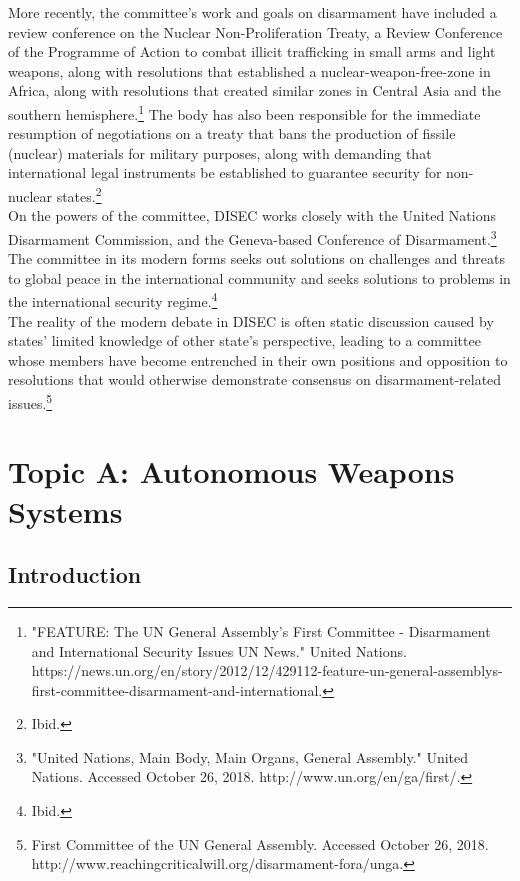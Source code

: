 \documentclass[10pt, letterpaper]{article}
\begin{document}
More recently, the committee's work and goals on disarmament have
included a review conference on the Nuclear Non-Proliferation Treaty, a
Review Conference of the Programme of Action to combat illicit
trafficking in small arms and light weapons, along with resolutions that
established a nuclear-weapon-free-zone in Africa, along with resolutions
that created similar zones in Central Asia and the southern
hemisphere.\footnote{"FEATURE: The UN General Assembly's First Committee
  - Disarmament and International Security Issues \textbar{} UN News."
  United Nations.
  https://news.un.org/en/story/2012/12/429112-feature-un-general-assemblys-first-committee-disarmament-and-international.}
The body has also been responsible for the immediate resumption of
negotiations on a treaty that bans the production of fissile (nuclear)
materials for military purposes, along with demanding that international
legal instruments be established to guarantee security for non-nuclear
states.\footnote{Ibid.} \\

On the powers of the committee, DISEC works closely with the United
Nations Disarmament Commission, and the Geneva-based Conference of
Disarmament.\footnote{"United Nations, Main Body, Main Organs, General
  Assembly." United Nations. Accessed October 26, 2018.
  http://www.un.org/en/ga/first/.} The committee in its modern forms
seeks out solutions on challenges and threats to global peace in the
international community and seeks solutions to problems in the
international security regime.\footnote{Ibid.} \\

The reality of the modern debate in DISEC is often static discussion
caused by states' limited knowledge of other state's perspective,
leading to a committee whose members have become entrenched in their own
positions and opposition to resolutions that would otherwise demonstrate
consensus on disarmament-related issues.\footnote{First Committee of the
  UN General Assembly. Accessed October 26, 2018.
  http://www.reachingcriticalwill.org/disarmament-fora/unga.} \\

\newpage
\section{Topic A: Autonomous Weapons Systems}

\subsection{Introduction}
\end{document}
